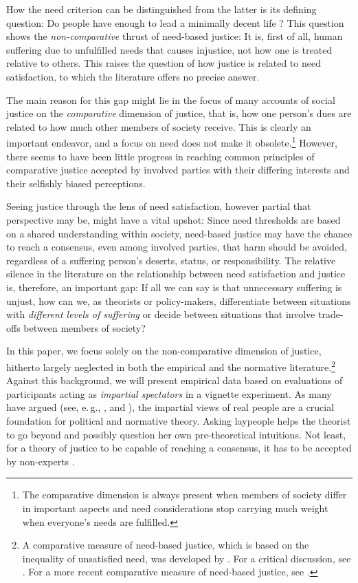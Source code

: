 \documentclass[12pt]{scrartcl}
\begin{document}
How the need criterion can be distinguished from the latter is its defining question: Do people have enough \citep{frankfurt_inequality_2015} to lead a minimally decent life \citep{miller_principles_1999}?
This question shows the \textit{non-comparative} \citep{feinberg_noncomparative_1974} thrust of need-based justice: It is, first of all, human suffering due to unfulfilled needs that causes injustice, not how one is treated relative to others.
This raises the question of how justice is related to need satisfaction, to which the literature offers no precise answer.

The main reason for this gap might lie in the focus of many accounts of social justice on the \textit{comparative} dimension of justice, that is, how one person's dues are related to how much other members of society receive.
This is clearly an important endeavor, and a focus on need does not make it obsolete.\footnote{The comparative dimension is always present when members of society differ in important aspects and need considerations stop carrying much weight when everyone's needs are fulfilled.}
However, there seems to have been little progress in reaching common principles of comparative justice accepted by involved parties with their differing interests and their selfishly biased perceptions.

Seeing justice through the lens of need satisfaction, however partial that perspective may be, might have a vital upshot: Since need thresholds are based on a shared understanding within society, need-based justice may have the chance to reach a consensus, even among involved parties, that harm should be avoided, regardless of a suffering person's deserts, status, or responsibility.
The relative silence in the literature on the relationship between need satisfaction and justice is, therefore, an important gap: If all we can say is that unnecessary suffering is unjust, how can we, as theorists or policy-makers, differentiate between situations with \textit{different levels of suffering} or decide between situations that involve trade-offs between members of society?

In this paper, we focus solely on the non-comparative dimension of justice, hitherto largely neglected in both the empirical and the normative literature.\footnote{A comparative measure of need-based justice, which is based on the inequality of unsatisfied need, was developed by \citet{miller_principles_1999}. For a critical discussion, see \citet{siebel_need_2020}. For a more recent comparative measure of need-based justice, see \citet{springhorn_measurement_2022}.}
Against this background, we will present empirical data based on evaluations of participants acting as \textit{impartial spectators} in a vignette experiment.
As many have argued (see, e.\,g., \citealp{konow_which_2003}, and \citealp{miller_distributive_2017}), the impartial views of real people are a crucial foundation for political and normative theory.
Asking laypeople helps the theorist to go beyond and possibly question her own pre-theoretical intuitions.
Not least, for a theory of justice to be capable of reaching a consensus, it has to be accepted by non-experts \citep[also see][]{de_vries_empirical_2009,bauer_empirical_2020}.
\end{document}
